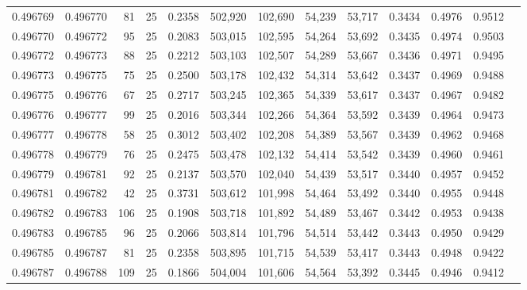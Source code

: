 \begin{tabular}{rrrrrrrrrrrrr}
0.496769 & 0.496770 &    81 &  25 &                                     0.2358 & 502,920 & 102,690 &  54,239 &  53,717 & 0.3434 & 0.4976 & 0.9512 \\
0.496770 & 0.496772 &    95 &  25 &                                     0.2083 & 503,015 & 102,595 &  54,264 &  53,692 & 0.3435 & 0.4974 & 0.9503 \\
0.496772 & 0.496773 &    88 &  25 &                                     0.2212 & 503,103 & 102,507 &  54,289 &  53,667 & 0.3436 & 0.4971 & 0.9495 \\
0.496773 & 0.496775 &    75 &  25 &                                     0.2500 & 503,178 & 102,432 &  54,314 &  53,642 & 0.3437 & 0.4969 & 0.9488 \\
0.496775 & 0.496776 &    67 &  25 &                                     0.2717 & 503,245 & 102,365 &  54,339 &  53,617 & 0.3437 & 0.4967 & 0.9482 \\
0.496776 & 0.496777 &    99 &  25 &                                     0.2016 & 503,344 & 102,266 &  54,364 &  53,592 & 0.3439 & 0.4964 & 0.9473 \\
0.496777 & 0.496778 &    58 &  25 &                                     0.3012 & 503,402 & 102,208 &  54,389 &  53,567 & 0.3439 & 0.4962 & 0.9468 \\
0.496778 & 0.496779 &    76 &  25 &                                     0.2475 & 503,478 & 102,132 &  54,414 &  53,542 & 0.3439 & 0.4960 & 0.9461 \\
0.496779 & 0.496781 &    92 &  25 &                                     0.2137 & 503,570 & 102,040 &  54,439 &  53,517 & 0.3440 & 0.4957 & 0.9452 \\
0.496781 & 0.496782 &    42 &  25 &                                     0.3731 & 503,612 & 101,998 &  54,464 &  53,492 & 0.3440 & 0.4955 & 0.9448 \\
0.496782 & 0.496783 &   106 &  25 &                                     0.1908 & 503,718 & 101,892 &  54,489 &  53,467 & 0.3442 & 0.4953 & 0.9438 \\
0.496783 & 0.496785 &    96 &  25 &                                     0.2066 & 503,814 & 101,796 &  54,514 &  53,442 & 0.3443 & 0.4950 & 0.9429 \\
0.496785 & 0.496787 &    81 &  25 &                                     0.2358 & 503,895 & 101,715 &  54,539 &  53,417 & 0.3443 & 0.4948 & 0.9422 \\
0.496787 & 0.496788 &   109 &  25 &                                     0.1866 & 504,004 & 101,606 &  54,564 &  53,392 & 0.3445 & 0.4946 & 0.9412 \\

\end{tabular}
